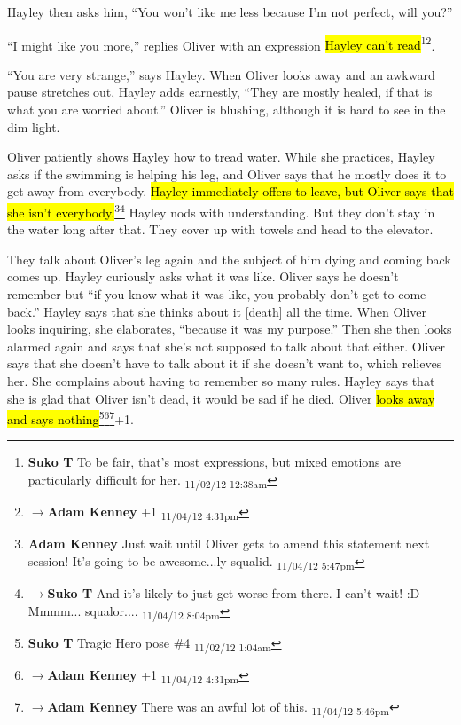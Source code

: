 Hayley then asks him, ``You won't like me less because I'm not perfect, will you?''

``I might like you more,'' replies Oliver with an expression \hl{Hayley can't read}\footnote{\textbf{Suko T }To be fair, that's most expressions, but mixed emotions are particularly difficult for her. \textsubscript{11/02/12 12:38am}}\footnote{$\rightarrow$\textbf{Adam Kenney }+1 \textsubscript{11/04/12 4:31pm}}.

``You are very strange,'' says Hayley.  When Oliver looks away and an awkward pause stretches out, Hayley adds earnestly, ``They are mostly healed, if that is what you are worried about.''  Oliver is blushing, although it is hard to see in the dim light.



Oliver patiently shows Hayley how to tread water. While she practices, Hayley asks if the swimming is helping his leg, and Oliver says that he mostly does it to get away from everybody.  \hl{Hayley immediately offers to leave, but Oliver says that she isn't everybody.}\footnote{\textbf{Adam Kenney }Just wait until Oliver gets to amend this statement next session!  It's going to be awesome...ly squalid. \textsubscript{11/04/12 5:47pm}}\footnote{$\rightarrow$\textbf{Suko T }And it's likely to just get worse from there.  I can't wait! :D  Mmmm... squalor.... \textsubscript{11/04/12 8:04pm}}  Hayley nods with understanding.  But they don't stay in the water long after that.  They cover up with towels and head to the elevator. 



They talk about Oliver's leg again and the subject of him dying and coming back comes up.  Hayley curiously asks what it was like.  Oliver says he doesn't remember but ``if you know what it was like, you probably don't get to come back.''  Hayley says that she thinks about it {[}death{]} all the time.  When Oliver looks inquiring, she elaborates, ``because it was my purpose.''  Then she then looks alarmed again and says that she's not supposed to talk about that either.  Oliver says that she doesn't have to talk about it if she doesn't want to, which relieves her. She complains about having to remember so many rules.  Hayley says that she is glad that Oliver isn't dead, it would be sad if he died.  Oliver \hl{looks away and says nothing}\footnote{\textbf{Suko T }Tragic Hero pose \#4 \textsubscript{11/02/12 1:04am}}\footnote{$\rightarrow$\textbf{Adam Kenney }+1 \textsubscript{11/04/12 4:31pm}}\footnote{$\rightarrow$\textbf{Adam Kenney }There was an awful lot of this. \textsubscript{11/04/12 5:46pm}}+1.



